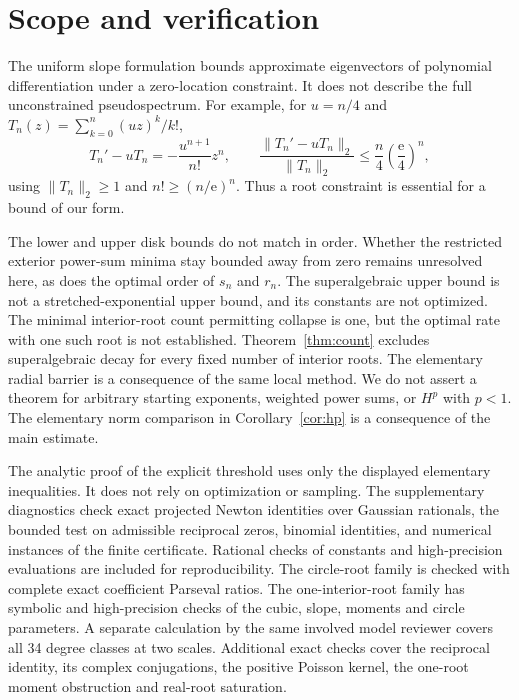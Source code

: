 \documentclass[11pt]{article}
\theoremstyle{remark}\newtheorem{remark}[theorem]{Remark}
\newcommand{\norm}[1]{\lVert #1\rVert}
\newcommand{\ee}{\mathrm e}
\begin{document}
\section{Scope and verification}
The uniform slope formulation bounds approximate eigenvectors of
polynomial differentiation under a zero-location constraint.
It does not describe the full unconstrained pseudospectrum.
For example, for \(u=n/4\) and
\(T_n(z)=\sum_{k=0}^n(uz)^k/k!\),
\[
 T_n'-uT_n=-\frac{u^{n+1}}{n!}z^n,\qquad
 \frac{\norm{T_n'-uT_n}_2}{\norm{T_n}_2}
       \le\frac n4\left(\frac{\ee}{4}\right)^n,
\]
using \(\norm{T_n}_2\ge1\) and \(n!\ge(n/\ee)^n\).
Thus a root constraint is essential for a bound of our form.

The lower and upper disk bounds do not match in order.
Whether the restricted exterior power-sum minima stay bounded
away from zero remains unresolved here, as does the optimal order
of \(s_n\) and \(r_n\).
The superalgebraic upper bound is not a stretched-exponential upper
bound, and its constants are not optimized. The minimal interior-root
count permitting collapse is one, but the optimal rate with one such
root is not established. Theorem~\ref{thm:count} excludes
superalgebraic decay for every fixed number of interior roots. The elementary radial
barrier is a consequence of the same local method.
We do not assert a theorem for arbitrary starting exponents,
weighted power sums, or \(H^p\) with \(p<1\).
The elementary norm comparison in Corollary~\ref{cor:hp} is a
consequence of the main estimate.

The analytic proof of the explicit threshold uses only the displayed
elementary inequalities. It does not rely on optimization or sampling.
The supplementary diagnostics check exact projected Newton identities
over Gaussian rationals, the bounded test on admissible reciprocal
zeros, binomial identities, and numerical instances of the finite
certificate. Rational checks of constants and high-precision
evaluations are included for reproducibility. The circle-root family
is checked with complete exact coefficient Parseval ratios.
The one-interior-root family has symbolic and high-precision checks
of the cubic, slope, moments and circle parameters.
A separate calculation by the same involved model reviewer covers
all 34 degree classes at two scales.
Additional exact checks cover the reciprocal identity, its complex
conjugations, the positive Poisson kernel, the one-root moment
obstruction and real-root saturation.
\end{document}
